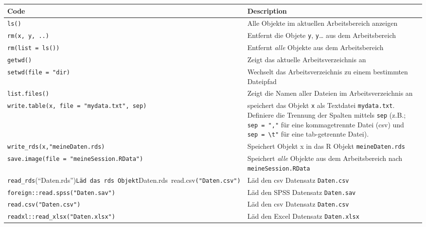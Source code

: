 \documentclass[
]{book}
\newcounter{none} %
\begin{document}
{\def\LTcaptype{none} %
\begin{longtable}[]{@{}
  >{\raggedright\arraybackslash}p{}
  >{\raggedright\arraybackslash}p{}@{}}
\toprule\noalign{}
\begin{minipage}[b]{\linewidth}\raggedright
Code
\end{minipage} & \begin{minipage}[b]{\linewidth}\raggedright
Description
\end{minipage} \\
\midrule\noalign{}
\endhead
\bottomrule\noalign{}
\endlastfoot
\texttt{ls()} & Alle Objekte im aktuellen Arbeitsbereich anzeigen \\
\texttt{rm(x,\ y,\ ..)} & Entfernt die Objete \texttt{y}, \texttt{y}\ldots{} aus dem Arbeitsbereich \\
\texttt{rm(list\ =\ ls())} & Entfernt \emph{alle} Objekte aus dem Arbeitsbereich \\
\texttt{getwd()} & Zeigt das aktuelle Arbeitsverzeichnis an \\
\texttt{setwd(file\ =\ "dir)} & Wechselt das Arbeitsverzeichnis zu einem bestimmten Dateipfad \\
\texttt{list.files()} & Zeigt die Namen aller Dateien im Arbeitsverzeichnis an \\
\texttt{write.table(x,\ file\ =\ "mydata.txt",\ sep)} & speichert das Objekt \texttt{x} als Textdatei \texttt{mydata.txt}. Definiere die Trennung der Spalten mittels \texttt{sep} (z.B.; \texttt{sep\ =\ ","} für eine kommagetrennte Datei (csv) und \texttt{sep\ =\ \textbackslash{}t"} für eine tab-getrennte Datei). \\
\texttt{write\_rds(x,"meineDaten.rds)} & Speichert Objekt x in das R Objekt \texttt{meineDaten.rds} \\
\texttt{save.image(file\ =\ "meineSession.RData")} & Speichert \emph{alle} Objekte aus dem Arbeitsbereich nach \texttt{meineSession.RData} \\
\texttt{read\_rds}(``Daten.rds'')\texttt{\textbar{}Läd\ das\ rds\ Objekt}Daten.rds\texttt{\textbar{}\ \textbar{}}read.csv\texttt{("Daten.csv")} & Läd den csv Datensatz \texttt{Daten.csv} \\
\texttt{foreign::read.spss("Daten.sav")} & Läd den SPSS Datensatz \texttt{Daten.sav} \\
\texttt{read.csv("Daten.csv")} & Läd den csv Datensatz \texttt{Daten.csv} \\
\texttt{readxl::read\_xlsx("Daten.xlsx")} & Läd den Excel Datensatz \texttt{Daten.xlsx} \\
\end{longtable}
}
\end{document}
